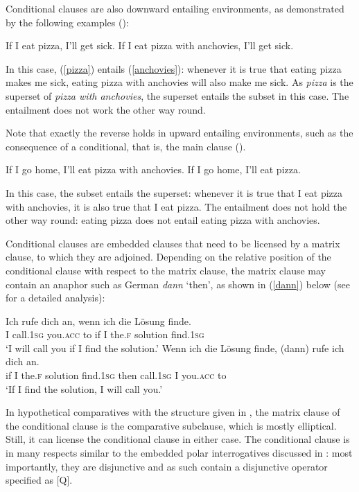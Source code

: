 Conditional clauses are also downward entailing environments, as demonstrated by the following examples (\citealt[504, ex. 6]{panizzachierchiaclifton2009}):

\ea
\ea If I eat pizza, I'll get sick. \label{pizza}
\ex If I eat pizza with anchovies, I'll get sick. \label{anchovies}
\z
\z

In this case, (\ref{pizza}) entails (\ref{anchovies}): whenever it is true that eating pizza makes me sick, eating pizza with anchovies will also make me sick. As \textit{pizza} is the superset of \textit{pizza with anchovies}, the superset entails the subset in this case. The entailment does not work the other way round.

Note that exactly the reverse holds in upward entailing environments, such as the consequence of a conditional, that is, the main clause (\citealt[504, ex. 4]{panizzachierchiaclifton2009}).

\ea
\ea If I go home, I'll eat pizza with anchovies.
\ex If I go home, I'll eat pizza.
\z
\z

In this case, the subset entails the superset: whenever it is true that I eat pizza with anchovies, it is also true that I eat pizza. The entailment does not hold the other way round: eating pizza does not entail eating pizza with anchovies.

Conditional clauses are embedded clauses that need to be licensed by a matrix clause, to which they are adjoined. Depending on the relative position of the conditional clause with respect to the matrix clause, the matrix clause may contain an anaphor such as German \textit{dann} `then', as shown in (\ref{dann}) below (see \citealt{bacskaiatkari2018lb} for a detailed analysis):

\ea \label{dann}
\ea \gll Ich rufe dich an, wenn ich die Lösung finde.\\
I call.\textsc{1sg} you.\textsc{acc} to if I the.\textsc{f} solution find.\textsc{1sg}\\
\glt `I will call you if I find the solution.'
\ex\gll Wenn ich die Lösung finde, (dann) rufe ich dich an.\\
if I the.\textsc{f} solution find.\textsc{1sg} \phantom{(}then call.\textsc{1sg} I you.\textsc{acc} to\\
\glt `If I find the solution, I will call you.'
\z
\z

In hypothetical comparatives with the structure given in , the matrix clause of the conditional clause is the comparative subclause, which is mostly elliptical. Still, it can license the conditional clause in either case. The conditional clause is in many respects similar to the embedded polar interrogatives discussed in : most importantly, they are disjunctive and as such contain a disjunctive operator specified as [Q].

